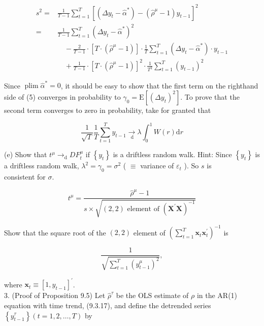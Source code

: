 \documentclass[10pt]{article}
\begin{document}
\begin{align*}
s^{2}= & \frac{1}{T-1} \sum_{t=1}^{T}\left[\left(\Delta y_{t}-\hat{\alpha}^{*}\right)-\left(\hat{\rho}^{\mu}-1\right) y_{t-1}\right]^{2} \\
= & \frac{1}{T-1} \sum_{t=1}^{T}\left(\Delta y_{t}-\hat{\alpha}^{*}\right)^{2} \\
& \quad-\frac{2}{T-1} \cdot\left[T \cdot\left(\hat{\rho}^{\mu}-1\right)\right] \cdot \frac{1}{T} \sum_{t=1}^{T}\left(\Delta y_{t}-\hat{\alpha}^{*}\right) \cdot y_{t-1} \\
& \quad+\frac{1}{T-1} \cdot\left[T \cdot\left(\hat{\rho}^{\mu}-1\right)\right]^{2} \cdot \frac{1}{T^{2}} \sum_{t=1}^{T}\left(y_{t-1}\right)^{2} \tag{5}
\end{align*}


Since $\operatorname{plim} \hat{\alpha}^{*}=0$, it should be easy to show that the first term on the righthand side of (5) converges in probability to $\gamma_{0}=\mathrm{E}\left[\left(\Delta y_{t}\right)^{2}\right]$. To prove that the second term converges to zero in probability, take for granted that


\begin{equation*}
\frac{1}{\sqrt{T}} \frac{1}{T} \sum_{t=1}^{T} y_{t-1} \underset{\mathrm{~d}}{\rightarrow} \lambda \int_{0}^{1} W(r) \mathrm{d} r \tag{6}
\end{equation*}


(e) Show that $t^{\mu} \rightarrow_{\mathrm{d}} D F_{t}^{\mu}$ if $\left\{y_{t}\right\}$ is a driftless random walk. Hint: Since $\left\{y_{t}\right\}$ is a driftless random walk, $\lambda^{2}=\gamma_{0}=\sigma^{2}$ ( $\equiv$ variance of $\varepsilon_{t}$ ). So $s$ is\\
consistent for $\sigma$.


\begin{equation*}
t^{\mu}=\frac{\hat{\rho}^{\mu}-1}{s \times \sqrt{(2,2) \text { element of }\left(\mathbf{X}^{\prime} \mathbf{X}\right)^{-1}}} \tag{7}
\end{equation*}


Show that the square root of the $(2,2)$ element of $\left(\sum_{t=1}^{T} \mathbf{x}_{t} \mathbf{x}_{t}^{\prime}\right)^{-1}$ is

$$
\frac{1}{\sqrt{\sum_{t=1}^{T}\left(y_{t-1}^{\mu}\right)^{2}}},
$$

where $\mathbf{x}_{t} \equiv\left[1, y_{t-1}\right]^{\prime}$.\\
3. (Proof of Proposition 9.5) Let $\hat{\rho}^{\tau}$ be the OLS estimate of $\rho$ in the AR(1) equation with time trend, (9.3.17), and define the detrended series $\left\{y_{t-1}^{\tau}\right\}(t= 1,2, \ldots, T)$ by
\end{document}
